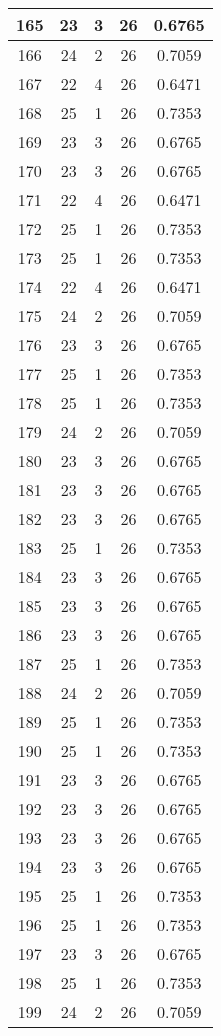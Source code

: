 \documentclass[letterpaper, 12pt]{article}
\begin{document}
\begin{longtable}{|c|c|c|c|c|}
\hline
165 & 23 & 3 & 26 & 0.6765 \\
\hline
166 & 24 & 2 & 26 & 0.7059 \\
\hline
167 & 22 & 4 & 26 & 0.6471 \\
\hline
168 & 25 & 1 & 26 & 0.7353 \\
\hline
169 & 23 & 3 & 26 & 0.6765 \\
\hline
170 & 23 & 3 & 26 & 0.6765 \\
\hline
171 & 22 & 4 & 26 & 0.6471 \\
\hline
172 & 25 & 1 & 26 & 0.7353 \\
\hline
173 & 25 & 1 & 26 & 0.7353 \\
\hline
174 & 22 & 4 & 26 & 0.6471 \\
\hline
175 & 24 & 2 & 26 & 0.7059 \\
\hline
176 & 23 & 3 & 26 & 0.6765 \\
\hline
177 & 25 & 1 & 26 & 0.7353 \\
\hline
178 & 25 & 1 & 26 & 0.7353 \\
\hline
179 & 24 & 2 & 26 & 0.7059 \\
\hline
180 & 23 & 3 & 26 & 0.6765 \\
\hline
181 & 23 & 3 & 26 & 0.6765 \\
\hline
182 & 23 & 3 & 26 & 0.6765 \\
\hline
183 & 25 & 1 & 26 & 0.7353 \\
\hline
184 & 23 & 3 & 26 & 0.6765 \\
\hline
185 & 23 & 3 & 26 & 0.6765 \\
\hline
186 & 23 & 3 & 26 & 0.6765 \\
\hline
187 & 25 & 1 & 26 & 0.7353 \\
\hline
188 & 24 & 2 & 26 & 0.7059 \\
\hline
189 & 25 & 1 & 26 & 0.7353 \\
\hline
190 & 25 & 1 & 26 & 0.7353 \\
\hline
191 & 23 & 3 & 26 & 0.6765 \\
\hline
192 & 23 & 3 & 26 & 0.6765 \\
\hline
193 & 23 & 3 & 26 & 0.6765 \\
\hline
194 & 23 & 3 & 26 & 0.6765 \\
\hline
195 & 25 & 1 & 26 & 0.7353 \\
\hline
196 & 25 & 1 & 26 & 0.7353 \\
\hline
197 & 23 & 3 & 26 & 0.6765 \\
\hline
198 & 25 & 1 & 26 & 0.7353 \\
\hline
199 & 24 & 2 & 26 & 0.7059 \\
\hline
\end{longtable}
\end{document}
